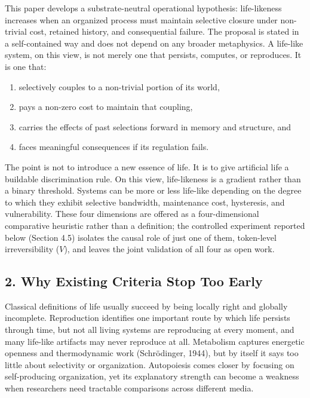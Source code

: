 \documentclass[Afour,sageh,times,doublespace]{sagej}
\providecommand{\tightlist}{\setlength{\itemsep}{0pt}\setlength{\parskip}{0pt}}
\begin{document}
This paper develops a substrate-neutral operational hypothesis: life-likeness increases when an organized process must maintain selective closure under non-trivial cost, retained history, and consequential failure. The proposal is stated in a self-contained way and does not depend on any broader metaphysics. A life-like system, on this view, is not merely one that persists, computes, or reproduces. It is one that:

\begin{enumerate}
\def\labelenumi{\arabic{enumi}.}
\tightlist
\item
  selectively couples to a non-trivial portion of its world,
\item
  pays a non-zero cost to maintain that coupling,
\item
  carries the effects of past selections forward in memory and structure, and
\item
  faces meaningful consequences if its regulation fails.
\end{enumerate}

The point is not to introduce a new essence of life. It is to give artificial life a buildable discrimination rule. On this view, life-likeness is a gradient rather than a binary threshold. Systems can be more or less life-like depending on the degree to which they exhibit selective bandwidth, maintenance cost, hysteresis, and vulnerability. These four dimensions are offered as a four-dimensional comparative heuristic rather than a definition; the controlled experiment reported below (Section 4.5) isolates the causal role of just one of them, token-level irreversibility (\(V\)), and leaves the joint validation of all four as open work.

\subsection{2. Why Existing Criteria Stop Too Early}\label{why-existing-criteria-stop-too-early}

Classical definitions of life usually succeed by being locally right and globally incomplete. Reproduction identifies one important route by which life persists through time, but not all living systems are reproducing at every moment, and many life-like artifacts may never reproduce at all. Metabolism captures energetic openness and thermodynamic work (Schrödinger, 1944), but by itself it says too little about selectivity or organization. Autopoiesis comes closer by focusing on self-producing organization, yet its explanatory strength can become a weakness when researchers need tractable comparisons across different media.
\end{document}
